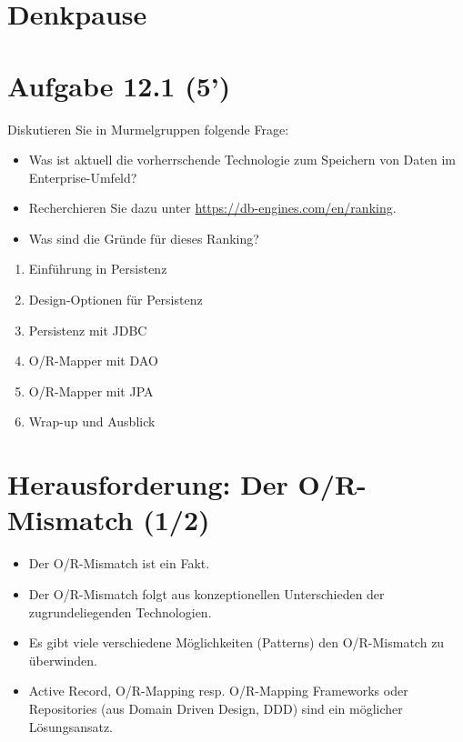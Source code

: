\section*{Denkpause}
\section*{Aufgabe 12.1 (5')}
Diskutieren Sie in Murmelgruppen folgende Frage:

\begin{itemize}
  \item Was ist aktuell die vorherrschende Technologie zum Speichern von Daten im Enterprise-Umfeld?
  \item Recherchieren Sie dazu unter \href{https://db-engines.com/en/ranking}{https://db-engines.com/en/ranking}.
  \item Was sind die Gründe für dieses Ranking?
\end{itemize}

\begin{enumerate}
  \item Einführung in Persistenz
  \item Design-Optionen für Persistenz
  \item Persistenz mit JDBC
  \item O/R-Mapper mit DAO
  \item O/R-Mapper mit JPA
  \item Wrap-up und Ausblick
\end{enumerate}

\section*{Herausforderung: Der O/R-Mismatch (1/2)}
\begin{itemize}
  \item Der O/R-Mismatch ist ein Fakt.
  \item Der O/R-Mismatch folgt aus konzeptionellen Unterschieden der zugrundeliegenden Technologien.
  \item Es gibt viele verschiedene Möglichkeiten (Patterns) den O/R-Mismatch zu überwinden.
  \item Active Record, O/R-Mapping resp. O/R-Mapping Frameworks oder Repositories (aus Domain Driven Design, DDD) sind ein möglicher Lösungsansatz.
\end{itemize}

